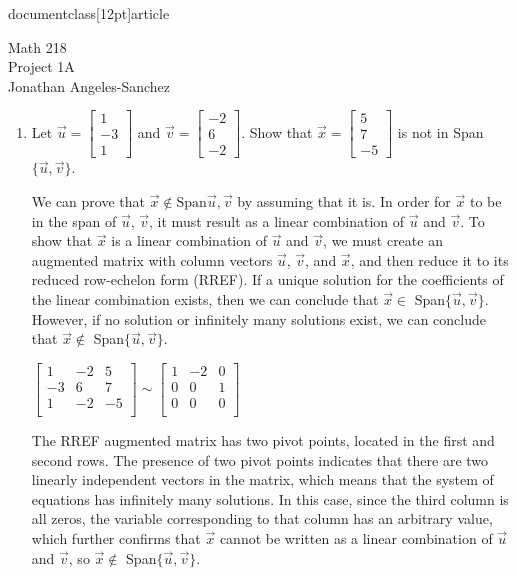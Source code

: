 documentclass[12pt]{article}
\usepackage[margin=1in]{geometry}
\usepackage{amsmath,amssymb}
\usepackage{graphicx}

\pagestyle{empty}

\begin{center}
Math 218
\\Project 1A
\\Jonathan Angeles-Sanchez
\end{center}

\begin{enumerate}
\item Let $\vec{u}=\left[\begin{array}{c}
1\\
-3\\
1
\end{array}\right]$ and $\vec{v}=\left[\begin{array}{c}
-2\\
6\\
-2
\end{array}\right]$.  Show that $\vec{x}=\left[\begin{array}{c}
5\\
7\\
-5\end{array}\right]$ is not in Span$\{\vec{u},\vec{v}\}$.

We can prove that $\vec{x} \notin \text{Span}{\vec{u},\vec{v}}$ by assuming that it is. In order for $\vec{x}$ to be in the span of $\vec{u}$, $\vec{v}$, it must result as a linear combination of $\vec{u}$ and $\vec{v}$. To show that $\vec{x}$ is a linear combination of $\vec{u}$ and $\vec{v}$, we must create an augmented matrix with column vectors $\vec{u}$, $\vec{v}$, and $\vec{x}$, and then reduce it to its reduced row-echelon form (RREF). If a unique solution for the coefficients of the linear combination exists, then we can conclude that $\vec{x} \in $ Span$\{\vec{u},\vec{v}\}$. However, if no solution or infinitely many solutions exist, we can conclude that $\vec{x} \notin
$ Span$\{\vec{u},\vec{v}\}$.
\begin{center}
$\left[\begin{array}{ccc}
1 & -2 & 5\\
-3 & 6 & 7\\
1 & -2 & -5\\
\end{array}\right]
%
\sim\left[\begin{array}{ccc}
1 & -2 & 0\\
0 & 0 & 1\\
0 & 0 & 0\\
\end{array}\right]$
\end{center}
The RREF augmented matrix has two pivot points, located in the first and second rows. The presence of two pivot points indicates that there are two linearly independent vectors in the matrix, which means that the system of equations has infinitely many solutions. In this case, since the third column is all zeros, the variable corresponding to that column has an arbitrary value, which further confirms that $\vec{x}$ cannot be written as a linear combination of $\vec{u}$ and $\vec{v}$, so $\vec{x} \notin $ Span$\{\vec{u},\vec{v}\}$.


\end{enumerate}
